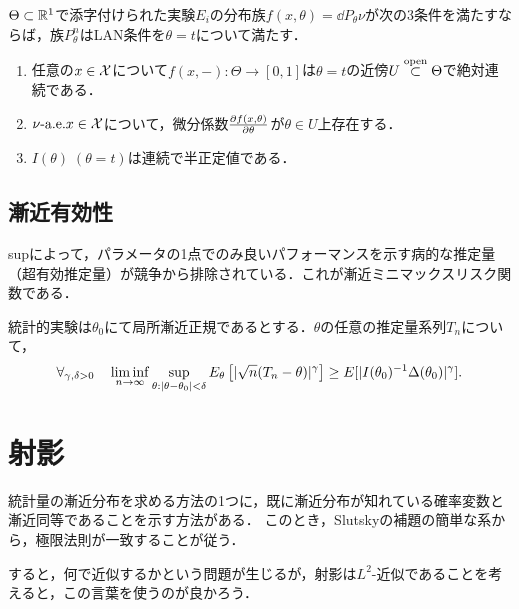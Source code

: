 \documentclass[uplatex,dvipdfmx]{jsreport}
\begin{document}
\begin{theorem}[Hajekの十分条件]
    $\Theta\subset\mathbb{R}^1$で添字付けられた実験$E_i$の分布族$f(x,\theta)=\dd{P_\theta}{\nu}$が次の3条件を満たすならば，族$P^n_\theta$はLAN条件を$\theta=t$について満たす．
    \begin{enumerate}
        \item 任意の$x\in\mathcal{X}$について$f(x,-):\Theta\to[0,1]$は$\theta=t$の近傍$U\overset{\mathrm{open}}{\subset}\Theta$で絶対連続である．
        \item $\nu\text{-a.e.} x\in\mathcal{X}$について，微分係数$\frac{\partial f(x,\theta)}{\partial \theta}$が$\theta\in U$上存在する．
        \item $I(\theta)\;(\theta=t)$は連続で半正定値である．
    \end{enumerate}
\end{theorem}

\subsection{漸近有効性}

\begin{tcolorbox}[colframe=ForestGreen, colback=ForestGreen!10!white,breakable,colbacktitle=ForestGreen!40!white,coltitle=black,fonttitle=\bfseries\sffamily,
title=]
    supによって，パラメータの1点でのみ良いパフォーマンスを示す病的な推定量（超有効推定量）が競争から排除されている．これが漸近ミニマックスリスク関数である．
\end{tcolorbox}

\begin{theorem}[Hajekの不等式]
    統計的実験は$\theta_0$にて局所漸近正規であるとする．$\theta$の任意の推定量系列$T_n$について，
    \[\forall_{\gamma,\delta>0}\quad\liminf_{n\to\infty}\sup_{\theta:\lvert\theta-\theta_0\rvert<\delta}E_\theta\left[\lvert\sqrt{n}(T_n-\theta)\rvert^\gamma\right]\ge E[\lvert I(\theta_0)^{-1}\Delta(\theta_0)\rvert^\gamma].\]
\end{theorem}

\section{射影}

\begin{tcolorbox}[colframe=ForestGreen, colback=ForestGreen!10!white,breakable,colbacktitle=ForestGreen!40!white,coltitle=black,fonttitle=\bfseries\sffamily,
title=]
    統計量の漸近分布を求める方法の1つに，既に漸近分布が知れている確率変数と漸近同等であることを示す方法がある．
    このとき，Slutskyの補題の簡単な系から，極限法則が一致することが従う．

    すると，何で近似するかという問題が生じるが，射影は$L^2$-近似であることを考えると，この言葉を使うのが良かろう．
\end{tcolorbox}
\end{document}
